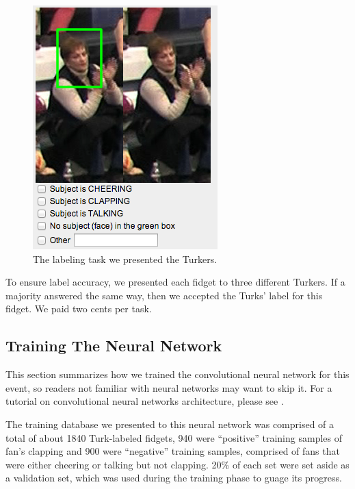 \documentclass[times, 10pt,twocolumn]{article}
\begin{document}
\begin{figure}[bt]
\centering
\includegraphics[width=0.96\columnwidth]{turk}
\caption{\label{fig_turk} \small The labeling task we presented the Turkers. }
\end{figure}

To ensure label accuracy, we presented each fidget to three different Turkers.  If a majority answered the same way, then we accepted the Turks’ label for this fidget.  We paid two cents per task.

\subsection{Training The Neural Network}
\label{sec_train}

This section summarizes how we trained the convolutional neural network for this event, so readers not familiar with neural networks may want to skip it.  For a tutorial on convolutional neural networks architecture, please see \cite{deeplearning}.

The training database we presented to this neural network was comprised of a total of about 1840 Turk-labeled fidgets, 940 were ``positive'' training samples of fan’s clapping and 900 were ``negative'' training samples, comprised of fans that were either cheering or talking but not clapping.  20\% of each set were set aside as a validation set, which was used during the training phase to guage its progress.
\end{document}
